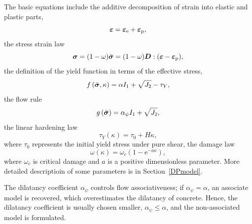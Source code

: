 \documentclass[a4paper]{article}
\newcommand{\mbf}[1]{\mbox{\boldmath$#1$}}
\newcommand{\alphaPsi}{\alpha_{\psi}}
\newcommand{\veps}{\mbf{\varepsilon}}  %
\newcommand{\vsig}{\mbf{\sigma}}%
\begin{document}
The basic equations include the additive decomposition of strain into elastic and plastic parts,
\begin{equation}
\veps = \veps_{\rm{e}} + \veps_{\rm{p}},
\end{equation}
the stress strain law 
\begin{equation}
\vsig = (1-\omega)\bar{\vsig}=(1-\omega)\mbf{D} :(\veps-\veps_{\rm{p}}),
\end{equation}
the definition of the yield function in terms of the effective stress,
\begin{equation}
f \left(\bar{\vsig},\kappa \right) = \alpha I_1 + \sqrt{J_2} - \tau_Y,
\end{equation}
the flow rule
\begin{equation}
g \left( \bar{\vsig} \right) = \alphaPsi I_1 + \sqrt{J_2},
\end{equation}
the linear hardening law
\begin{equation}
\tau_Y(\kappa) = \tau_0 + H\kappa,
\end{equation}
where $\tau_0$ represents the initial yield stress under pure shear,
the damage law
\begin{equation}
\label{damagelawDP}
\omega(\kappa) = \omega_c(1-\mbox{e}^{-a\kappa}),
\end{equation}
where $\omega_c$ is critical damage and $a$ is a positive dimensionless parameter.
More detailed descriptioin of some parameters is in Section~\ref{DPmodel}.

The dilatancy coefficient $\alphaPsi$ controls flow associativeness; if $\alphaPsi=\alpha$, an associate model is recovered, which
overestimates the dilatancy of concrete. Hence, the dilatancy coefficient is usually chosen smaller, 
$\alphaPsi \leq \alpha$, and the non-associated model is formulated.

% 
\end{document}
